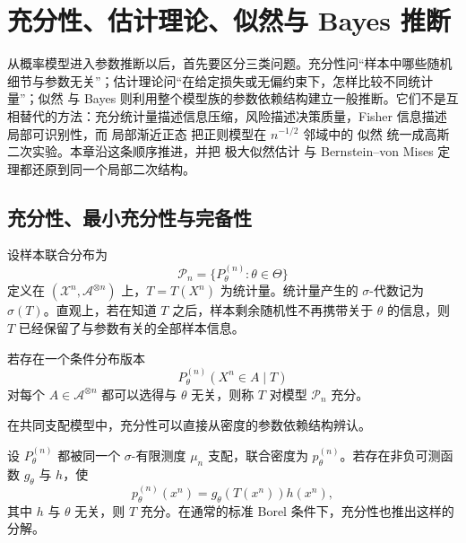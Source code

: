\chapter{充分性、估计理论、似然与 Bayes 推断}\label{chap:math-stat-estimation-likelihood} \label{chap:math-inference}

从概率模型进入参数推断以后，首先要区分三类问题。充分性问“样本中哪些随机细节与参数无关”；估计理论问“在给定损失或无偏约束下，怎样比较不同统计量”；似然 与 Bayes 则利用整个模型族的参数依赖结构建立一般推断。它们不是互相替代的方法：充分统计量描述信息压缩，风险描述决策质量，Fisher 信息描述局部可识别性，而 局部渐近正态 把正则模型在 $n^{-1/2}$ 邻域中的 似然 统一成高斯二次实验。本章沿这条顺序推进，并把 极大似然估计 与 Bernstein--von Mises 定理都还原到同一个局部二次结构。

\section{充分性、最小充分性与完备性}

设样本联合分布为
\[
 \mathcal P_n=\{P_\theta^{(n)}:\theta\in\Theta\}
\]
定义在 $(\mathcal X^n,\mathcal A^{\otimes n})$ 上，$T=T(X^n)$ 为统计量。统计量产生的 $\sigma$-代数记为 $\sigma(T)$。直观上，若在知道 $T$ 之后，样本剩余随机性不再携带关于 $\theta$ 的信息，则 $T$ 已经保留了与参数有关的全部样本信息。

\begin{definition}[充分统计量]
若存在一个条件分布版本
\[
 P_\theta^{(n)}(X^n\in A\mid T)
\]
对每个 $A\in\mathcal A^{\otimes n}$ 都可以选得与 $\theta$ 无关，则称 $T$ 对模型 $\mathcal P_n$ 充分。
\end{definition}

在共同支配模型中，充分性可以直接从密度的参数依赖结构辨认。

\begin{theorem}
设 $P_\theta^{(n)}$ 都被同一个 $\sigma$-有限测度 $\mu_n$ 支配，联合密度为 $p_\theta^{(n)}$。若存在非负可测函数 $g_\theta$ 与 $h$，使
\begin{equation*}p_\theta^{(n)}(x^n)
 =g_\theta(T(x^n))h(x^n),
\end{equation*}
其中 $h$ 与 $\theta$ 无关，则 $T$ 充分。在通常的标准 Borel 条件下，充分性也推出这样的分解。
\end{theorem}


